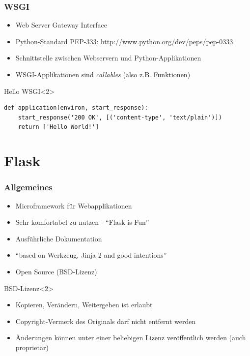 \documentclass{beamer}
\begin{document}
\begin{frame}[fragile]
  \frametitle{WSGI}
  \begin{itemize}
    \item Web Server Gateway Interface
    \item Python-Standard PEP-333: \url{http://www.python.org/dev/peps/pep-0333}
    \item Schnittstelle zwischen Webservern und Python-Applikationen
    \item WSGI-Applikationen sind \emph{callables} (also z.B. Funktionen)
  \end{itemize}
  \begin{exampleblock}{Hello WSGI}<2>
    \begin{lstlisting}
def application(environ, start_response):
    start_response('200 OK', [('content-type', 'text/plain')])
    return ['Hello World!']
    \end{lstlisting}
  \end{exampleblock}
\end{frame}

\section{Flask}
\begin{frame}
  \frametitle{Allgemeines}
  \begin{itemize}
    \item Microframework für Webapplikationen
    \item Sehr komfortabel zu nutzen - \enquote{Flask is Fun}
    \item Ausführliche Dokumentation
    \item \enquote{based on Werkzeug, Jinja 2 and good intentions}
    \item Open Source (BSD-Lizenz)
  \end{itemize}

  \begin{block}{BSD-Lizenz}<2>
    \begin{itemize}
      \item Kopieren, Verändern, Weitergeben ist erlaubt
      \item Copyright-Vermerk des Originals darf nicht entfernt werden
      \item Änderungen können unter einer beliebigen Lizenz veröffentlich werden (auch proprietär)
    \end{itemize}
  \end{block}
\end{frame}
\end{document}
